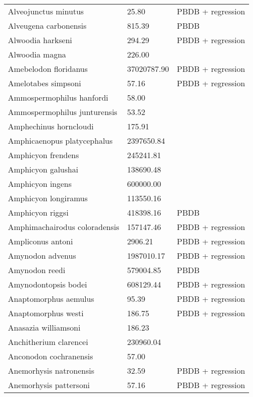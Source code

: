 \documentclass{article}
\begin{document}
\begin{center}
\begin{longtable}{p{} p{} p{}}
    Alveojunctus minutus & 25.80 & PBDB + regression \\ 
    Alveugena carbonensis & 815.39 & PBDB \\ 
    Alwoodia harkseni & 294.29 & PBDB + regression \\ 
    Alwoodia magna & 226.00 & \cite{McKenna2011} \\ 
    Amebelodon floridanus & 37020787.90 & PBDB + regression \\ 
    Amelotabes simpsoni & 57.16 & PBDB + regression \\ 
    Ammospermophilus hanfordi & 58.00 & \cite{McKenna2011} \\ 
    Ammospermophilus junturensis & 53.52 & \cite{Tomiya2013} \\ 
    Amphechinus horncloudi & 175.91 & \cite{Tomiya2013} \\ 
    Amphicaenopus platycephalus & 2397650.84 & \cite{Tomiya2013} \\ 
    Amphicyon frendens & 245241.81 & \cite{Tomiya2013} \\ 
    Amphicyon galushai & 138690.48 & \cite{Tomiya2013} \\ 
    Amphicyon ingens & 600000.00 & \cite{Sorkin2008} \\ 
    Amphicyon longiramus & 113550.16 & \cite{Tomiya2013} \\ 
    Amphicyon riggsi & 418398.16 & PBDB \\ 
    Amphimachairodus coloradensis & 157147.46 & PBDB + regression \\ 
    Ampliconus antoni & 2906.21 & PBDB + regression \\ 
    Amynodon advenus & 1987010.17 & PBDB + regression \\ 
    Amynodon reedi & 579004.85 & PBDB \\ 
    Amynodontopsis bodei & 608129.44 & PBDB + regression \\ 
    Anaptomorphus aemulus & 95.39 & PBDB + regression \\ 
    Anaptomorphus westi & 186.75 & PBDB + regression \\ 
    Anasazia williamsoni & 186.23 & \cite{Williamson2012} \\ 
    Anchitherium clarencei & 230960.04 & \cite{Tomiya2013} \\ 
    Anconodon cochranensis & 57.00 & \cite{Wilson2012} \\ 
    Anemorhysis natronensis & 32.59 & PBDB + regression \\ 
    Anemorhysis pattersoni & 57.16 & PBDB + regression \\ 

\end{longtable}
\end{center}
\end{document}
